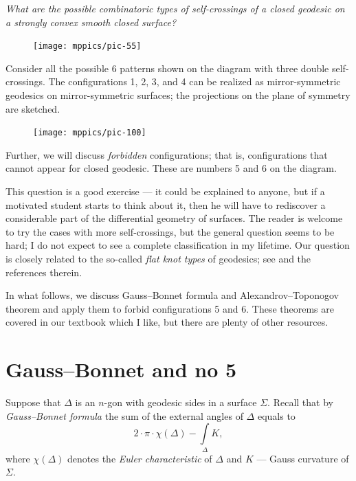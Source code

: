 \documentclass[oneside,a4paper]{amsart}
\begin{document}
\medskip

\emph{What are the possible combinatoric types of self-crossings of a closed geodesic on a strongly convex smooth closed surface?}

\begin{figure}[ht!]
\begin{center}
\texttt{[image: mppics/pic-55]}
\end{center}
\end{figure}

Consider all the possible 6 patterns shown on the diagram with three double self-crossings.
The configurations 1, 2, 3, and 4 can be realized as mirror-symmetric geodesics on mirror-symmetric surfaces; the projections on the plane of symmetry are sketched.
\begin{figure}[ht!]
\begin{center}
\texttt{[image: mppics/pic-100]}
\end{center}
\end{figure}

Further, we will discuss \emph{forbidden} configurations;
that is, configurations that cannot appear for closed geodesic. 
These are numbers 5 and 6 on the diagram.

This question is a good exercise --- it could be explained to anyone, but if a motivated student starts to think about it, then he will have to rediscover a considerable part of the differential geometry of surfaces.
The reader is welcome to try the cases with more self-crossings, but the general question seems to be hard;
I do not expect to see a complete classification in my lifetime.
Our question is closely related to the so-called \emph{flat knot types} of geodesics;
see \cite{angenent} and the references therein.

In what follows, we discuss Gauss--Bonnet formula and Alexandrov--Toponogov theorem and apply them to forbid configurations 5 and 6.
These theorems are covered in our textbook \cite{petrunin-zamora} which I like, but there are plenty of other resources.


\section*{Gauss--Bonnet and no 5}

Suppose that $\Delta$ is an $n$-gon with geodesic sides in a surface $\Sigma$.
Recall that by \emph{Gauss--Bonnet formula} the sum of the external angles of $\Delta$ equals to
\[2\cdot\pi\cdot\chi(\Delta)-\int\limits_\Delta K,\]
where $\chi(\Delta)$ denotes the \emph{Euler characteristic} of $\Delta$ and $K$ --- Gauss curvature of $\Sigma$.
\end{document}
